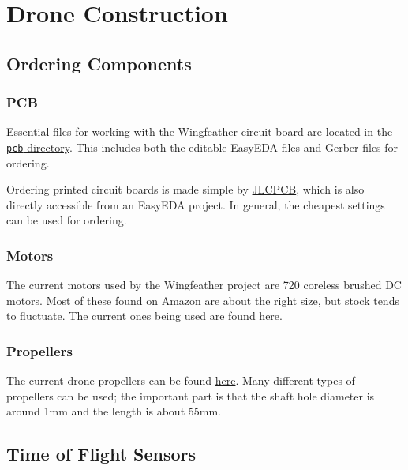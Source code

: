 \documentclass[12pt, titlepage]{article}
\begin{document}
\section{Drone Construction}

\subsection{Ordering Components}
\subsubsection{PCB}

Essential files for working with the Wingfeather circuit board are located in the \href{https://github.com/Team-Wingfeather/fcl_senior_design/tree/main/pcb}{\texttt{pcb} directory}. This includes both the editable EasyEDA files and Gerber files for ordering.

Ordering printed circuit boards is made simple by \href{https://jlcpcb.com/}{JLCPCB}, which is also directly accessible from an EasyEDA project. In general, the cheapest settings can be used for ordering.

\subsubsection{Motors}
The current motors used by the Wingfeather project are 720 coreless brushed DC motors. Most of these found on Amazon are about the right size, but stock tends to fluctuate. The current ones being used are found \href{https://www.amazon.com/dp/B0BBR16BK3}{here}.

\subsubsection{Propellers}
The current drone propellers can be found \href{https://www.amazon.com/uxcell-Propellers-Walkera-Ladybird-Quadcopter/dp/B07Y6LP7QP/ref=sr_1_2?sr=8-2}{here}. Many different types of propellers can be used; the important part is that the shaft hole diameter is around 1mm and the length is about 55mm.

\subsection{Time of Flight Sensors}
\end{document}
